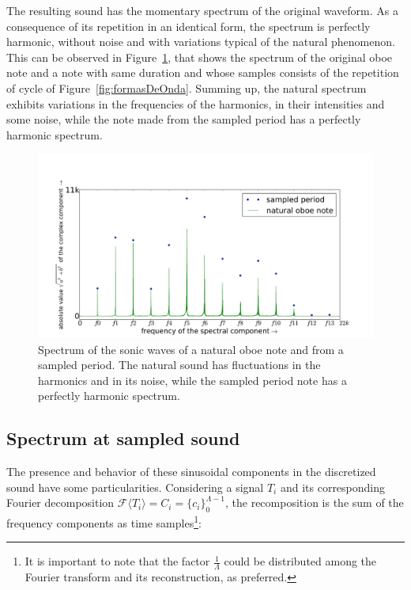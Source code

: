 \documentclass[
 aip,
 jmp,
 amsmath,amssymb,
 reprint,
]{revtex4-1}
\begin{document}
The resulting sound has the momentary spectrum of the original waveform. As a consequence of its repetition in an identical form, the spectrum is perfectly harmonic, without noise and with variations typical of the natural phenomenon. This can be observed in Figure~\ref{fig:espectroOboe}, that shows the spectrum of the original oboe note and a note with same duration and whose samples consists of the repetition of cycle of Figure~\ref{fig:formasDeOnda}. Summing up, the natural spectrum exhibits variations in the frequencies of the harmonics, in their intensities and some noise, while the note made from the sampled period has a perfectly harmonic spectrum.

\begin{figure}
    \centering
        \includegraphics[width=\columnwidth]{figures/oboeNaturalSampledSpectrum}
    \caption{Spectrum of the sonic waves of a natural oboe note and from a sampled period. The natural sound has fluctuations in the harmonics and in its noise, while the sampled period note has a perfectly harmonic spectrum.}
        \label{fig:espectroOboe}
\end{figure}


\subsection{Spectrum at sampled sound}

The presence and behavior of these sinusoidal components in the discretized sound have some particularities. Considering a signal $T_i$ and its corresponding Fourier decomposition $\mathcal{F}\langle T_i\rangle=C_i=\{c_i\}_0^{\Lambda-1}$, the recomposition is the sum of the frequency components as time samples\footnote{It is important to note that the factor $\frac{1}{\Lambda}$ could be distributed among the Fourier transform and its reconstruction, as preferred.}:
\end{document}
